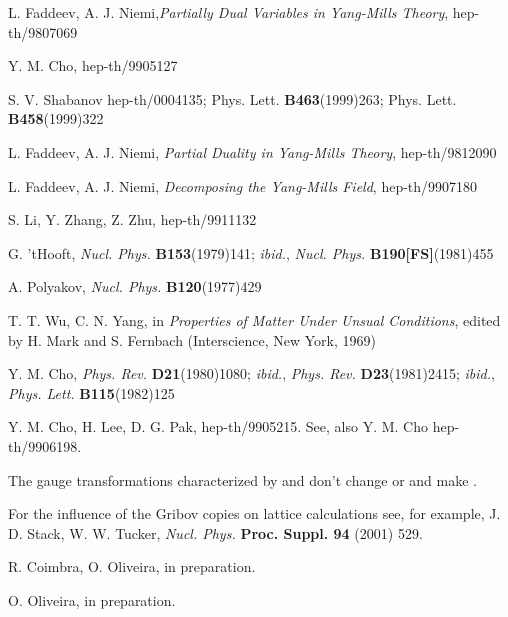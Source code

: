 \documentclass[a4paper,a4paper]{article}
\begin{document}
\begin{thebibliography}{99}

 L. Faddeev, A. J. Niemi,\textit{Partially Dual Variables
 in \coordHE{} Yang-Mills Theory}, hep-th/9807069

 Y. M. Cho, hep-th/9905127

 S. V. Shabanov hep-th/0004135; 
              Phys. Lett. \textbf{B463}(1999)263;
              Phys. Lett. \textbf{B458}(1999)322

 L. Faddeev, A. J. Niemi, \textit{Partial Duality in \coordHE{}
                  Yang-Mills Theory}, hep-th/9812090

 L. Faddeev, A. J. Niemi, \textit{Decomposing the Yang-Mills
                 Field}, hep-th/9907180

 S. Li, Y. Zhang, Z. Zhu, hep-th/9911132

 G. 'tHooft, \textit{Nucl. Phys.} \textbf{B153}(1979)141; 
               \textit{ibid.}, \textit{Nucl. Phys.} \textbf{B190[FS]}(1981)455

 A. Polyakov, \textit{Nucl. Phys.} \textbf{B120}(1977)429

 T. T. Wu, C. N. Yang, in \textit{Properties of Matter Under
               Unsual Conditions}, edited by H. Mark and S. Fernbach
               (Interscience, New York, 1969)

 Y. M. Cho, \textit{Phys. Rev.} \textbf{D21}(1980)1080;
                \textit{ibid.}, \textit{Phys. Rev.} \textbf{D23}(1981)2415;
                \textit{ibid.}, \textit{Phys. Lett.} \textbf{B115}(1982)125

 Y. M. Cho, H. Lee, D. G. Pak, hep-th/9905215. See, also
                    Y. M. Cho hep-th/9906198.

 The gauge transformations characterized by \coordHE{} and \coordHE{} don't change \coordHE{}
or \coordHE{} and make \coordHE{}.

 For the influence of the Gribov copies on lattice calculations
                see, for example, J. D. Stack, W. W. Tucker, 
                \textit{Nucl. Phys.} \textbf{Proc. Suppl. 94} (2001) 529.

 R. Coimbra, O. Oliveira, in preparation.

 O. Oliveira, in preparation.


\end{thebibliography}
\end{document}
